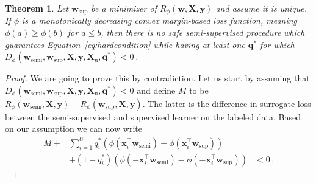 \documentclass[twoside]{memoir}\usepackage[]{graphicx}\usepackage{xcolor}
\newtheorem{theorem}{Theorem}
\begin{document}
\begin{theorem} \label{theorem:hardlabels}
Let $\mathbf{w}_\mathrm{sup}$ be a minimizer of $ {R}_\phi(\mathbf{w},\mathbf{X},\mathbf{y})$ and assume it is unique. If $\phi$ is a monotonically decreasing convex margin-based loss function, meaning $\phi(a) \geq \phi(b)$ for $a\leq b$, then there is no safe semi-supervised procedure which guarantees Equation~\eqref{eq:hardcondition} while having at least one $\mathbf{q}^\ast$ for which $ {D}_\phi(\mathbf{w}_\mathrm{semi},\mathbf{w}_\mathrm{sup},\mathbf{X},\mathbf{y},\mathbf{X}_\mathrm{u},\mathbf{q}^\ast) < 0$\,.
\end{theorem}
\begin{proof}
We are going to prove this by contradiction. Let us start by assuming that ${D}_\phi(\mathbf{w}_\mathrm{semi},\mathbf{w}_\mathrm{sup},\mathbf{X},\mathbf{y},\mathbf{X}_\mathrm{u},\mathbf{q}^\ast) < 0$ and define $M$ to be $R_\phi(\mathbf{w}_\mathrm{semi},\mathbf{X},\mathbf{y})-R_\phi(\mathbf{w}_\mathrm{sup},\mathbf{X},\mathbf{y})$.  The latter is the difference in surrogate loss between the semi-supervised and supervised learner on the labeled data.   Based on our assumption we can now write
\begin{align} \label{eq:D_qast}
M + & \sum_{i=1}^{U}  q^\ast_i (\phi(\mathbf{x}_i^\top \mathbf{w}_\mathrm{semi})- \phi(\mathbf{x}_i^\top \mathbf{w}_\mathrm{sup})) & \\
 &+ (1-q^\ast_i) (\phi(-\mathbf{x}_i^\top \mathbf{w}_\mathrm{semi}) - \phi(-\mathbf{x}_i^\top \mathbf{w}_\mathrm{sup})) & < 0 \, . \nonumber
\end{align}


\end{proof}
\end{document}

